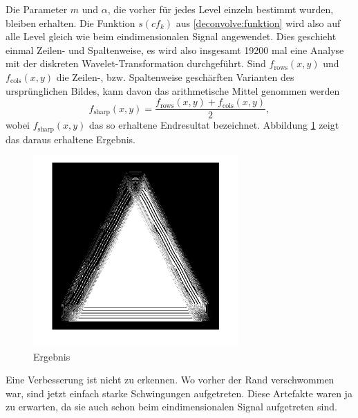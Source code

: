 Die Parameter $m$ und $\alpha$, die vorher für jedes Level einzeln bestimmt wurden, bleiben erhalten.
Die Funktion $s(cf_k)$ aus \eqref{deconvolve:funktion} wird also auf alle Level gleich wie beim eindimensionalen Signal angewendet.
Dies geschieht einmal Zeilen- und Spaltenweise, es wird also insgesamt 19200 mal eine Analyse mit der diskreten Wavelet-Transformation durchgeführt.
Sind $f_\text{rows}(x,y)$ und $f_\text{cols}(x,y)$ die Zeilen-, bzw. Spaltenweise \glqq geschärften\grqq{} Varianten des ursprünglichen Bildes, kann davon das arithmetische Mittel genommen werden
$$f_\text{sharp}(x,y)=\frac{f_\text{rows}(x,y)+f_\text{cols}(x,y)}{2},$$
wobei $f_\text{sharp}(x,y)$ das so erhaltene Endresultat bezeichnet.
Abbildung \ref{deconvolve:ergebnis} zeigt das daraus erhaltene Ergebnis.
\begin{figure}[h]
\centering
\includegraphics[width=0.7\textwidth]{./papers/deconvolve/pictures/dreieck_sharp.png}
\caption{Ergebnis\label{deconvolve:ergebnis}}
\end{figure}
 
Eine Verbesserung ist nicht zu erkennen. Wo vorher der Rand verschwommen war, sind jetzt einfach starke Schwingungen aufgetreten.
Diese Artefakte waren ja zu erwarten, da sie auch schon beim eindimensionalen Signal aufgetreten sind.